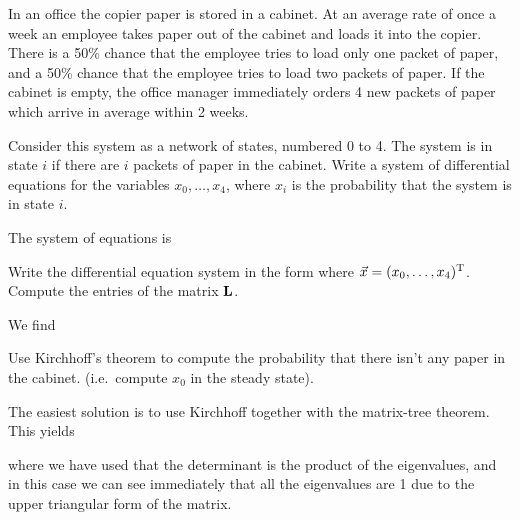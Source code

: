 In an office the copier paper is stored in a cabinet. At an average rate of once a week an employee takes paper out of the cabinet and loads it into the copier. There is a 50\% chance that the employee tries to load only one packet of paper, and a 50\% chance that the employee tries to load two packets of paper. If the cabinet is empty, the office manager immediately orders 4 new packets of paper which arrive in average within 2 weeks. 

\subquestion Consider this system as a network of states, numbered 0 to 4. The system is in state $i$ if there are $i$ packets of paper in the cabinet. Write a system of differential equations for the variables $x_0,\ldots,x_4$,
where $x_i$ is the probability that the system is in state $i$.

\solution
The system of equations is 

\subquestion Write the differential equation system in the form 
where $\vec{x}=(x_0,\ldots,x_4)^{\rm T}$. Compute the entries of the matrix $\bf L$. 

\solution
We find 

\subquestion Use Kirchhoff's theorem to compute the probability that there isn't any paper in the cabinet. (i.e.~compute $x_0$ in the steady state).

\solution 
The easiest solution is to use Kirchhoff together with the matrix-tree theorem. This yields

where we have used that the determinant is the product of the eigenvalues, and in this case we can see immediately that all the eigenvalues are 1 due to the upper triangular form of the matrix.

